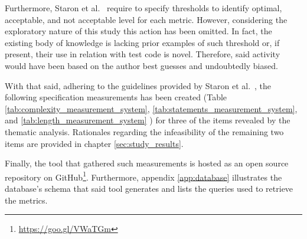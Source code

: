     Furthermore, Staron et al.\ \cite{metrics_paper} require to specify thresholds to identify optimal, acceptable, and not acceptable level for each metric. However, considering the exploratory nature of this study this action has been omitted. In fact, the existing body of knowledge is lacking prior examples of such threshold or, if present, their use in relation with test code is novel. Therefore, said activity would have been based on the author best guesses and undoubtedly biased.

    With that said, adhering to the guidelines provided by Staron et al.\ \cite{metrics_paper}, the following specification measurements has been created (Table \ref{tab:complexity_measurement_system}, \ref{tab:statements_measurement_system}, and \ref{tab:length_measurement_system} ) for three of the items revealed by the thematic analysis. Rationales regarding the infeasibility of the remaining two items are provided in chapter \ref{sec:study_results}.

    Finally, the tool that gathered such measurements is hosted as an open source repository on GitHub\footnote{\href{https://goo.gl/VWaTGm}{https://goo.gl/VWaTGm}}. Furthermore, appendix \ref{app:database} illustrates the database's schema that said tool generates and lists the queries used to retrieve the metrics.

